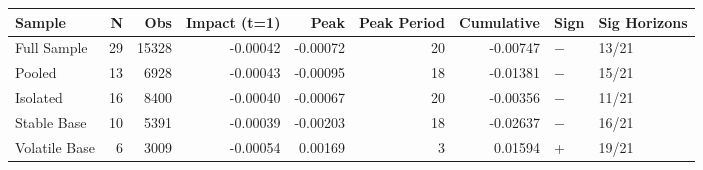 \begin{tabular}{lrrrrrrll}
\toprule
Sample & N & Obs & Impact (t=1) & Peak & Peak Period & Cumulative & Sign & Sig Horizons \\
\midrule
Full Sample & 29 & 15328 & -0.00042 & -0.00072 & 20 & -0.00747 & − & 13/21 \\
Pooled & 13 & 6928 & -0.00043 & -0.00095 & 18 & -0.01381 & − & 15/21 \\
Isolated & 16 & 8400 & -0.00040 & -0.00067 & 20 & -0.00356 & − & 11/21 \\
Stable Base & 10 & 5391 & -0.00039 & -0.00203 & 18 & -0.02637 & − & 16/21 \\
Volatile Base & 6 & 3009 & -0.00054 & 0.00169 & 3 & 0.01594 & + & 19/21 \\
\bottomrule
\end{tabular}
